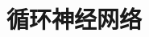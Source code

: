 \setcounter{chapter}{3}

\hypertarget{ux5faaux73afux795eux7ecfux7f51ux7edc}{%
\chapter{循环神经网络}\label{ux5faaux73afux795eux7ecfux7f51ux7edc}}
